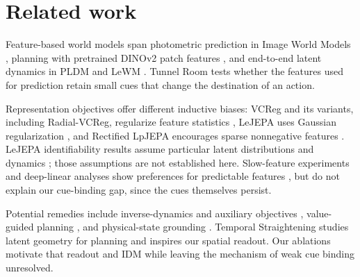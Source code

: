 \section{Related work}
\label{app:related}

Feature-based world models span photometric prediction in Image World
Models \citep{garrido2024iwm}, planning with pretrained DINOv2 patch features
\citep{zhou2025dinowm,oquab2023dinov2}, and end-to-end latent dynamics in
PLDM and LeWM \citep{sobal2025latentplanning,maes2026leworldmodel}. Tunnel
Room tests whether the features used for prediction retain small cues that
change the destination of an action.

Representation objectives offer different inductive biases: VCReg and its variants,
including Radial-VCReg, regularize feature statistics
\citep{bardes2022vicreg,kuang2026radialvcreg}, LeJEPA uses Gaussian
regularization \citep{balestriero2025lejepa}, and Rectified LpJEPA encourages
sparse nonnegative features \citep{kuang2026rectified}. LeJEPA identifiability
results assume particular latent distributions and dynamics
\citep{klindt2026when}; those assumptions are not established here.
Slow-feature experiments and deep-linear analyses show preferences for
predictable features \citep{sobal2022slow,littwin2024jepa}, but do not explain
our cue-binding gap, since the cues themselves persist.

Potential remedies include inverse-dynamics and auxiliary objectives
\citep{ivashkov2026sensorimotor,yu2025auxjepa}, value-guided planning
\citep{destrade2025value}, and physical-state grounding
\citep{yan2026psgjepa}. Temporal Straightening studies latent geometry for
planning \citep{wang2026temporal} and inspires our spatial readout. Our
ablations motivate that readout and IDM while leaving the mechanism of
weak cue binding unresolved.
